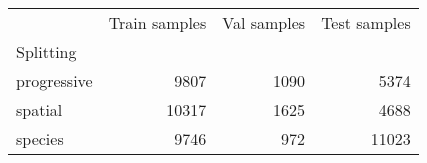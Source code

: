 \begin{tabular}{lrrr}
\toprule
{} &  Train samples &  Val samples &  Test samples \\
Splitting   &                &              &               \\
\midrule
progressive &           9807 &         1090 &          5374 \\
spatial     &          10317 &         1625 &          4688 \\
species     &           9746 &          972 &         11023 \\
\bottomrule
\end{tabular}
